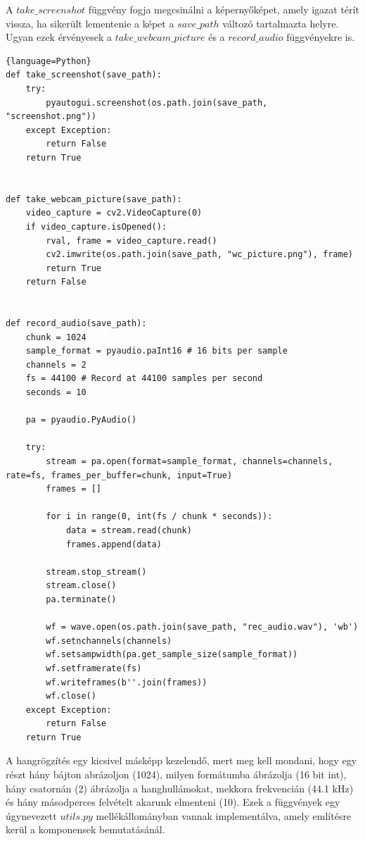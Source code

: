 \documentclass[12pt,a4paper,oneside]{report}
\begin{document}
A $take\_screenshot$ függvény fogja megcsinálni a képernyőképet, amely igazat térít vissza, ha sikerült lementenie a képet a $save\_path$ változó tartalmazta helyre. Ugyan ezek érvényesek a $take\_webcam\_picture$ és a $record\_audio$ függvényekre is.
\begin{lstlisting}{language=Python}
def take_screenshot(save_path):
	try:
		pyautogui.screenshot(os.path.join(save_path, "screenshot.png"))
	except Exception:
		return False
	return True

	
def take_webcam_picture(save_path):
	video_capture = cv2.VideoCapture(0)
	if video_capture.isOpened():
		rval, frame = video_capture.read()
		cv2.imwrite(os.path.join(save_path, "wc_picture.png"), frame)
		return True
	return False


def record_audio(save_path):
	chunk = 1024
	sample_format = pyaudio.paInt16 # 16 bits per sample
	channels = 2
	fs = 44100 # Record at 44100 samples per second
	seconds = 10

	pa = pyaudio.PyAudio()

	try:
		stream = pa.open(format=sample_format, channels=channels, rate=fs, frames_per_buffer=chunk, input=True)
		frames = []

		for i in range(0, int(fs / chunk * seconds)):
			data = stream.read(chunk)
			frames.append(data)

		stream.stop_stream()
		stream.close()
		pa.terminate()

		wf = wave.open(os.path.join(save_path, "rec_audio.wav"), 'wb')
		wf.setnchannels(channels)
		wf.setsampwidth(pa.get_sample_size(sample_format))
		wf.setframerate(fs)
		wf.writeframes(b''.join(frames))
		wf.close()
	except Exception:
		return False
	return True
\end{lstlisting}
A hangrögzítés egy kicsivel másképp kezelendő, mert meg kell mondani, hogy egy részt hány bájton abrázoljon (1024), milyen formátumba ábrázolja (16 bit int), hány csatornán (2) ábrázolja a hanghullámokat, mekkora frekvencián (44.1 kHz) és hány másodperces felvételt akarunk elmenteni (10). Ezek a függvények egy úgynevezett $utils.py$ mellékállományban vannak implementálva, amely említésre kerül a komponensek bemutatásánál.
\end{document}
